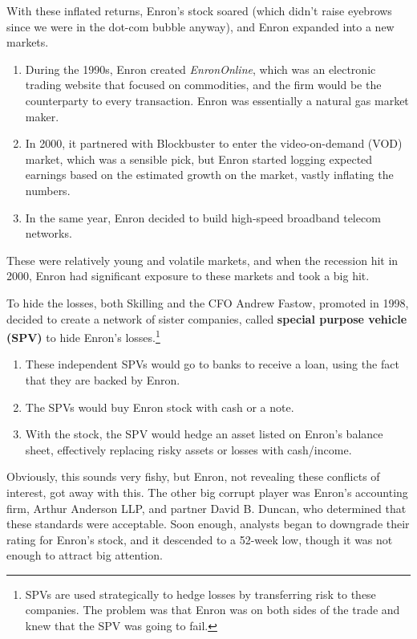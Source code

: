 \documentclass{article}
\begin{document}
  With these inflated returns, Enron's stock soared (which didn't raise eyebrows since we were in the dot-com bubble anyway), and Enron expanded into a new markets. 
  \begin{enumerate}
    \item During the 1990s, Enron created \textit{EnronOnline}, which was an electronic trading website that focused on commodities, and the firm would be the counterparty to every transaction. Enron was essentially a natural gas market maker. 
    \item In 2000, it partnered with Blockbuster to enter the video-on-demand (VOD) market, which was a sensible pick, but Enron started logging expected earnings based on the estimated growth on the market, vastly inflating the numbers. 
    \item In the same year, Enron decided to build high-speed broadband telecom networks.  
  \end{enumerate}
  These were relatively young and volatile markets, and when the recession hit in 2000, Enron had significant exposure to these markets and took a big hit. 

  To hide the losses, both Skilling and the CFO Andrew Fastow, promoted in 1998, decided to create a network of sister companies, called \textbf{special purpose vehicle (SPV)} to hide Enron's losses.\footnote{SPVs are used strategically to hedge losses by transferring risk to these companies. The problem was that Enron was on both sides of the trade and knew that the SPV was going to fail.} 
  \begin{enumerate}
    \item These independent SPVs would go to banks to receive a loan, using the fact that they are backed by Enron. 
    \item The SPVs would buy Enron stock with cash or a note. 
    \item With the stock, the SPV would hedge an asset listed on Enron's balance sheet, effectively replacing risky assets or losses with cash/income. 
  \end{enumerate}
  Obviously, this sounds very fishy, but Enron, not revealing these conflicts of interest, got away with this. The other big corrupt player was Enron's accounting firm, Arthur Anderson LLP, and partner David B. Duncan, who determined that these standards were acceptable. Soon enough, analysts began to downgrade their rating for Enron's stock, and it descended to a 52-week low, though it was not enough to attract big attention. 
\end{document}
